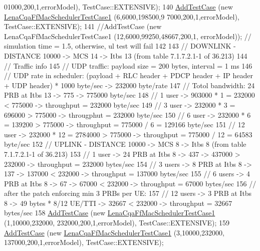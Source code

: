 \begin{DoxyCode}
      01000,200,1,errorModel), TestCase::EXTENSIVE);
140   \hyperlink{classns3_1_1TestCase_a3718088e3eefd5d6454569d2e0ddd835}{AddTestCase} (\textcolor{keyword}{new} \hyperlink{classLenaCqaFfMacSchedulerTestCase1}{LenaCqaFfMacSchedulerTestCase1} (6,6000,198500,9
      7000,200,1,errorModel), TestCase::EXTENSIVE);
141   \textcolor{comment}{//AddTestCase (new LenaCqaFfMacSchedulerTestCase1 (12,6000,99250,48667,200,1, errorModel)); // simulation
       time = 1.5, otherwise, ul test will fail}
142 
143   \textcolor{comment}{// DOWNLINK - DISTANCE 10000 -> MCS 14 -> Itbs 13 (from table 7.1.7.2.1-1 of 36.213)}
144   \textcolor{comment}{// Traffic info}
145   \textcolor{comment}{//   UDP traffic: payload size = 200 bytes, interval = 1 ms}
146   \textcolor{comment}{//   UDP rate in scheduler: (payload + RLC header + PDCP header + IP header + UDP header) * 1000 byte/sec
       -> 232000 byte/rate }
147   \textcolor{comment}{// Totol bandwidth: 24 PRB at Itbs 13 -> 775 -> 775000 byte/sec}
148   \textcolor{comment}{// 1 user -> 903000 * 1 = 232000 < 775000 -> throughput = 232000 byte/sec}
149   \textcolor{comment}{// 3 user -> 232000 * 3 = 696000 > 775000 -> througphut = 232000 byte/sec}
150   \textcolor{comment}{// 6 user -> 232000 * 6 = 139200 > 775000 -> throughput = 775000 / 6 = 129166 byte/sec}
151   \textcolor{comment}{// 12 user -> 232000 * 12 = 2784000 > 775000 -> throughput =  775000 / 12 = 64583 byte/sec}
152   \textcolor{comment}{// UPLINK - DISTANCE 10000 -> MCS 8 -> Itbs 8 (from table 7.1.7.2.1-1 of 36.213)}
153   \textcolor{comment}{// 1 user -> 24 PRB at Itbs 8 -> 437 -> 437000 > 232000 -> throughput = 232000 bytes/sec}
154   \textcolor{comment}{// 3 users -> 8 PRB at Itbs 8 -> 137 -> 137000 < 232000 -> throughput = 137000 bytes/sec}
155   \textcolor{comment}{// 6 users -> 4 PRB at Itbs 8 -> 67 -> 67000 < 232000 -> throughput = 67000 bytes/sec}
156   \textcolor{comment}{// after the patch enforcing min 3 PRBs per UE:}
157   \textcolor{comment}{// 12 users -> 3 PRB at Itbs 8 -> 49 bytes * 8/12 UE/TTI -> 32667 < 232000 -> throughput = 32667 
       bytes/sec}
158   \hyperlink{classns3_1_1TestCase_a3718088e3eefd5d6454569d2e0ddd835}{AddTestCase} (\textcolor{keyword}{new} \hyperlink{classLenaCqaFfMacSchedulerTestCase1}{LenaCqaFfMacSchedulerTestCase1} (1,10000,232000,
      232000,200,1,errorModel), TestCase::EXTENSIVE);
159   \hyperlink{classns3_1_1TestCase_a3718088e3eefd5d6454569d2e0ddd835}{AddTestCase} (\textcolor{keyword}{new} \hyperlink{classLenaCqaFfMacSchedulerTestCase1}{LenaCqaFfMacSchedulerTestCase1} (3,10000,232000,
      137000,200,1,errorModel), TestCase::EXTENSIVE);

\end{DoxyCode}
